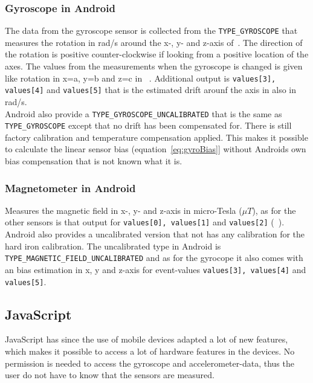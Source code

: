 \subsubsection{Gyroscope in Android}\label{subsec:gyroAndroid}
The data from the gyroscope sensor is collected from the \texttt{TYPE\_GYROSCOPE} that measures the rotation in rad/s around the x-, y- and z-axis of~. The direction of the rotation is positive counter-clockwise if looking from a positive location of the axes. The values from the measurements when the gyroscope is changed is given like rotation in x=a, y=b and z=c in ~. Additional output is \texttt{values[3], values[4]} and \texttt{values[5]} that is the estimated drift arounf the axis in also in rad/s.\\
Android also provide a \texttt{TYPE\_GYROSCOPE\_UNCALIBRATED} that is the same as \texttt{TYPE\_GYROSCOPE} except that no drift has been compensated for. There is still factory calibration and temperature compensation applied. \cite[]{android:sensorEvent} This makes it possible to calculate the linear sensor bias (equation~\ref{eq:gyroBias}] without Androids own bias compensation that is not known what it is.



\subsubsection{Magnetometer in Android}\label{subsec:magnAndroid}
Measures the magnetic field in x-, y- and z-axis in micro-Tesla ($\mu T$), as for the other sensors is that output for \texttt{values[0], values[1]} and \texttt{values[2]} (~). Android also provides a uncalibrated version that not has any calibration for the hard iron calibration. The uncalibrated type in Android is \texttt{TYPE\_MAGNETIC\_FIELD\_UNCALIBRATED} and as for the gyrocope it also comes with an bias estimation in x, y and z-axis for event-values \texttt{values[3], values[4]} and \texttt{values[5]}. 


\subsection{JavaScript}\label{subsec:js}
JavaScript has since the use of mobile devices adapted a lot of new features, which makes it possible to access a lot of hardware features in the devices. No permission is needed to access the gyroscope and accelerometer-data, thus the user do not have to know that the sensors are measured.


